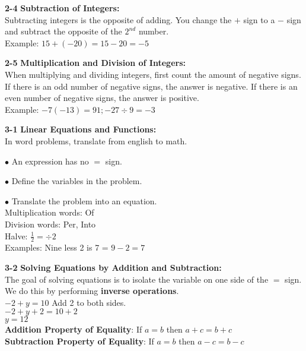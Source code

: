 \begin{enumerate*}
		\item[\Large\textbf{2-4}] \Large\textbf{Subtraction of Integers:}\\
			Subtracting integers is the opposite of adding. You change the $+$ sign to a $-$ sign and subtract the opposite of the $2^{nd}$ number.\\
			Example: $15+(-20)=15-20=-5$\\
			
		\item[\Large\textbf{2-5}] \Large\textbf{Multiplication and Division of Integers:}\\
			When multiplying and dividing integers, first count the amount of negative signs.\\
			If there is an odd number of negative signs, the answer is negative. If there is an even number of negative signs, the answer is positive.\\
			Example: $-7(-13)=91; -27\div9=-3$\\
			
		\item[\Large\textbf{3-1}] \Large\textbf{Linear Equations and Functions:}\\
			In word problems, translate from english to math.
			\begin{enumerate*}
			 \item[$\bullet$]An expression has no $=$ sign.
			 \item[$\bullet$]Define the variables in the problem.
			 \item[$\bullet$]Translate the problem into an equation.\\
			 Multiplication words: Of\\
			 Division words: Per, Into\\
			 Halve: $\frac{1}{2}=\div2$\\
			 Examples: Nine less 2 is 7 = $9-2=7$\\
			 \end{enumerate*}
			 
		\item[\Large\textbf{3-2}] \Large\textbf{Solving Equations by Addition and Subtraction:}\\
			The goal of solving equations is to isolate the variable on one side of the $=$ sign. We do this by performing \textbf{inverse operations}.\\
			$-2+y=10$ Add 2 to both sides.\\$-2+y+2=10+2$\\$y=12$\\
			\textbf{Addition Property of Equality}: If $a=b$ then $a+c=b+c$\\
			\textbf{Subtraction Property of Equality}: If $a=b$ then $a-c=b-c$\\
		

\end{enumerate*}

